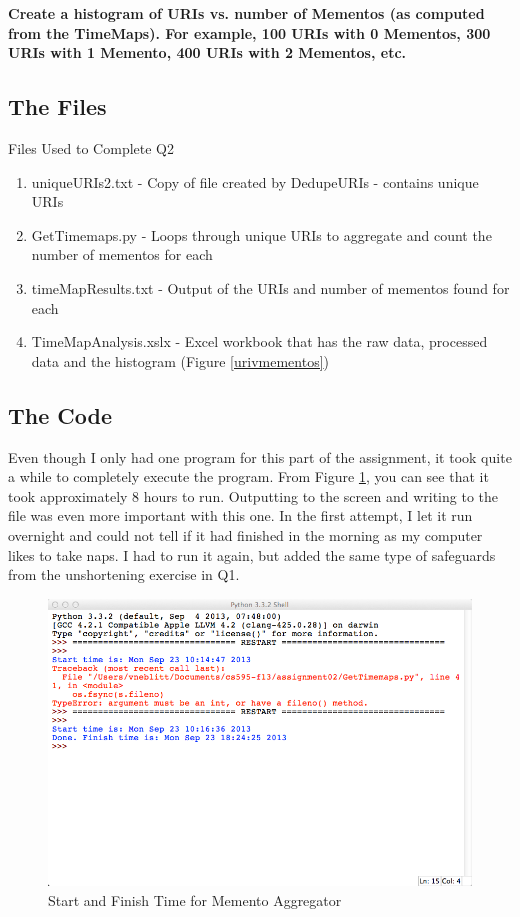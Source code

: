 \documentclass{article}
\begin{document}
\textbf{Create a histogram of URIs vs. number of Mementos (as computed from the TimeMaps). For example, 100 URIs with 0 Mementos, 300 URIs with 1 Memento, 400 URIs with 2 Mementos, etc.}

\subsection*{The Files}
Files Used to Complete Q2

\begin{enumerate}
\item uniqueURIs2.txt - Copy of file created by DedupeURIs - contains unique URIs
\item GetTimemaps.py - Loops through unique URIs to aggregate and count the number of mementos for each
\item timeMapResults.txt - Output of the URIs and number of mementos found for each
\item TimeMapAnalysis.xslx - Excel workbook that has the raw data, processed data and the histogram (Figure \ref{urivmementos})
\end{enumerate}

\subsection*{The Code}
Even though I only had one program for this part of the assignment, it took quite a while to completely execute the program. From Figure \ref{aggtime}, you can see that it took approximately 8 hours to run. Outputting to the screen and writing to the file was even more important with this one. In the first attempt, I let it run overnight and could not tell if it had finished in the morning as my computer likes to take naps. I had to run it again, but added the same type of safeguards from the unshortening exercise in Q1.

\begin{figure}[H]
\centering
\includegraphics[scale=0.50]{q2/MementoAggregatorRunTime}
\caption{Start and Finish Time for Memento Aggregator}
\label{aggtime}
\end{figure}
\end{document}
